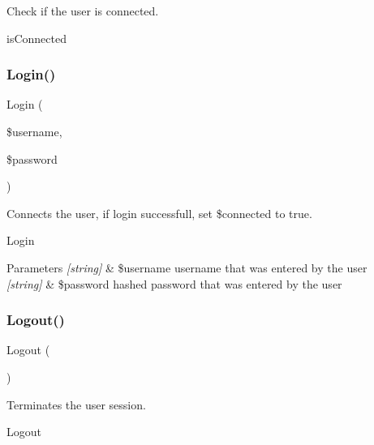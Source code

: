 Check if the user is connected. 

is\+Connected \mbox{\label{class_user_controller_a4a533e4b69f7790e6b74bff620275edc}} 
\subsubsection{\texorpdfstring{Login()}{Login()}}
{\footnotesize\ttfamily Login (\begin{DoxyParamCaption}\item[{}]{\$username,  }\item[{}]{\$password }\end{DoxyParamCaption})}



Connects the user, if login successfull, set \$connected to true. 

Login


\begin{DoxyParams}{Parameters}
{\em \mbox{[}string\mbox{]}} & \$username username that was entered by the user \\
\hline
{\em \mbox{[}string\mbox{]}} & \$password hashed password that was entered by the user \\
\hline
\end{DoxyParams}
\mbox{\label{class_user_controller_aa14f760d541a59acb41ac8eefddafb9b}} 
\subsubsection{\texorpdfstring{Logout()}{Logout()}}
{\footnotesize\ttfamily Logout (\begin{DoxyParamCaption}{ }\end{DoxyParamCaption})}



Terminates the user session. 

Logout \mbox{\label{class_user_controller_a73865eeee67d29dd7f3e888bbc8a90cb}} 
